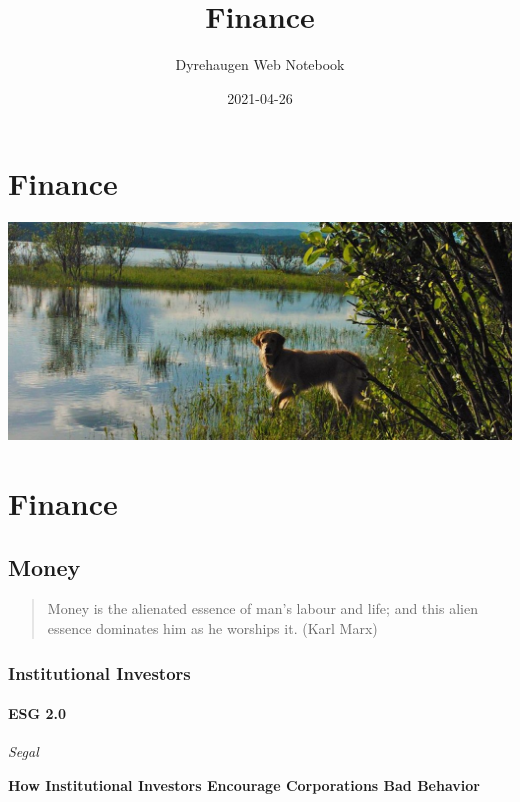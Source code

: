\documentclass[
]{book}
\title{Finance}
\author{Dyrehaugen Web Notebook}
\date{2021-04-26}
\begin{document}
\maketitle

{
\setcounter{tocdepth}{1}
\tableofcontents
}
\hypertarget{finance}{%
\chapter{Finance}\label{finance}}

\includegraphics{fig/zelda.jpg}

\hypertarget{finance-1}{%
\chapter{Finance}\label{finance-1}}

\hypertarget{money}{%
\section{Money}\label{money}}

\begin{quote}
Money is the alienated essence of man's labour and life; and this alien essence dominates him as he worships it. (Karl Marx)
\end{quote}

\hypertarget{institutional-investors}{%
\subsection{Institutional Investors}\label{institutional-investors}}

\hypertarget{esg-2.0}{%
\subsubsection{ESG 2.0}\label{esg-2.0}}

\emph{Segal}

\textbf{How Institutional Investors Encourage Corporations Bad Behavior}
\end{document}
